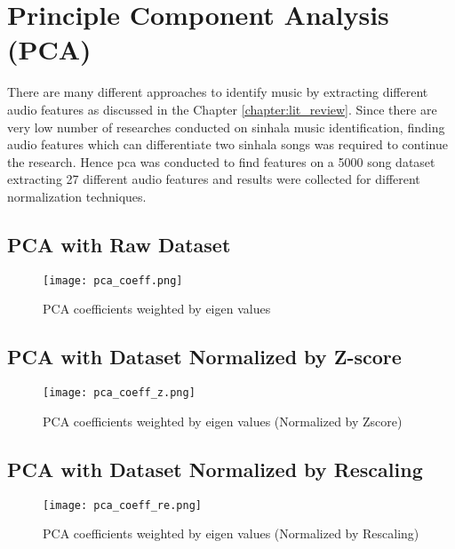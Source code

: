 \section{Principle Component Analysis (PCA)}
There are many different approaches to identify music by extracting different audio features as
discussed in the Chapter \ref{chapter:lit_review}. Since there are very low number of researches
conducted on sinhala music identification, finding audio features which can differentiate two 
sinhala songs was required to continue the research. Hence \ac{pca} was conducted to find features
on a 5000 song dataset extracting 27 different audio features and results were collected for 
different normalization techniques. 

\subsection{PCA with Raw Dataset}
\begin{figure}[H]
    \centering
    \texttt{[image: pca\_coeff.png]}
    \caption{PCA coefficients weighted by eigen values}
    \label{fig:pca_coeff}
\end{figure}

\subsection{PCA with Dataset Normalized by Z-score}
\begin{figure}[H]
    \centering
    \texttt{[image: pca\_coeff\_z.png]}
    \caption{PCA coefficients weighted by eigen values (Normalized by Zscore)}
    \label{fig:pca_coeff_z}
\end{figure}

\subsection{PCA with Dataset Normalized by Rescaling}
\begin{figure}[H]
    \centering
    \texttt{[image: pca\_coeff\_re.png]}
    \caption{PCA coefficients weighted by eigen values (Normalized by Rescaling)}
    \label{fig:pca_coeff_re}
\end{figure}